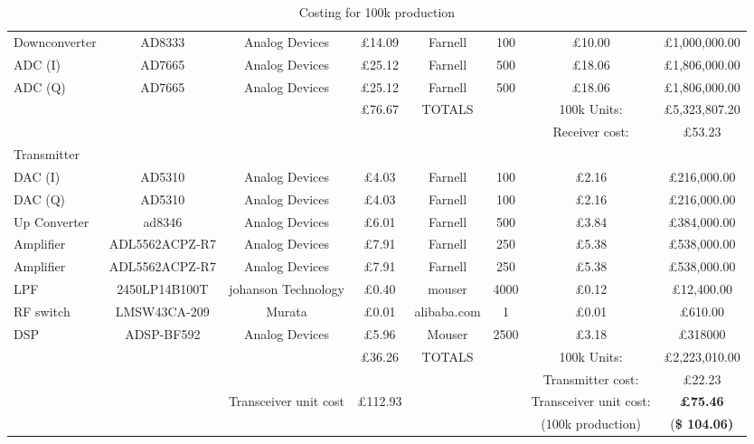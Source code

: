 \begin{sidewaystable}
\begin{tabular}{l c c c c c c c}
Downconverter& AD8333& Analog Devices& \pounds14.09& Farnell& 100& \pounds10.00& \pounds1,000,000.00\\

ADC (I)& AD7665 &Analog Devices& \pounds25.12 &Farnell& 500 &\pounds18.06 &\pounds1,806,000.00\\
ADC (Q)& AD7665 &Analog Devices& \pounds25.12 &Farnell& 500 &\pounds18.06 &\pounds1,806,000.00\\
\midrule %
&&&\pounds76.67 &TOTALS&& 100k Units: &\pounds5,323,807.20\\

&&&&&&Receiver cost:&\pounds53.23\\



Transmitter\\
\midrule
DAC (I)& AD5310 & Analog Devices &\pounds4.03 &Farnell& 100& \pounds 2.16 &\pounds216,000.00\\
DAC (Q)& AD5310 & Analog Devices &\pounds4.03 &Farnell& 100& \pounds 2.16 &\pounds216,000.00\\
Up Converter& ad8346& Analog Devices& \pounds6.01& Farnell& 500& \pounds3.84& \pounds384,000.00\\

Amplifier& ADL5562ACPZ-R7& Analog Devices& \pounds7.91& Farnell& 250& \pounds5.38& \pounds538,000.00\\

Amplifier& ADL5562ACPZ-R7& Analog Devices& \pounds7.91& Farnell& 250& \pounds5.38& \pounds538,000.00\\

LPF& 2450LP14B100T& johanson Technology& \pounds0.40& mouser& 4000& \pounds0.12& \pounds12,400.00\\
\midrule
RF switch& LMSW43CA-209& Murata& \pounds0.01 &alibaba.com &1 &\pounds0.01 &\pounds610.00\\
DSP&ADSP-BF592	&Analog Devices&	\pounds5.96&	Mouser&	2500&	\pounds3.18&	\pounds318000\\
\midrule

&&&\pounds36.26 & TOTALS && 100k Units:&\pounds2,223,010.00\\


&&&&&&Transmitter cost:&\pounds22.23\\


&&Transceiver unit cost	&\pounds112.93 &&&Transceiver unit cost: & \textbf{\pounds 75.46}\\
&&&&&&(100k production)&(\textbf{\$ 104.06)}\\

\end{tabular}
\caption{Costing for 100k production} %
\label{tab:cost} %
\end{sidewaystable}